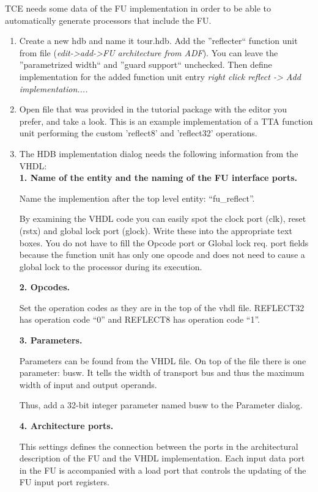 \documentclass[twoside]{tceusermanual}
\begin{document}
TCE needs some data of the FU implementation in order to be able to 
automatically generate processors that include the FU. \\
\begin{enumerate}
 \item%
Create a new hdb and name it tour.hdb. Add the ''reflecter`` function
unit from  file  (\textit{edit->add->FU architecture from ADF}).
You can leave the ''parametrized width`` and ''guard support`` unchecked.
Then define implementation for the added function unit entry \textit{right 
click reflect -> Add implementation....}\\

\item%
Open file  that was provided in the tutorial
package with the editor  you prefer, and take a look. This is an example
implementation of  a TTA function unit performing the custom 'reflect8'
and 'reflect32' operations.

\item%
The HDB implementation dialog needs the following information from the VHDL:\\

\textbf{1. Name of the entity and the naming of the FU interface ports.}

Name the implemention after the top level entity: ``fu\_reflect''.

By examining the VHDL code you can easily spot the clock port (clk),
reset (rstx) and global lock port (glock). Write these into the appropriate
text boxes. You do not have to fill the Opcode port or Global lock req. port
fields because the function unit has only one opcode and does not need to 
cause a global lock to the processor during its execution.

\textbf{2. Opcodes.}

Set the operation codes as they are in the top of the vhdl file. REFLECT32
has operation code ``0'' and REFLECT8 has operation code ``1''.

\textbf{3. Parameters.}

Parameters can be found from the VHDL file. On top of the file there is one
parameter: busw. It tells the width of transport bus and thus the maximum
width of input and output operands.

Thus, add a 32-bit integer parameter named busw to the Parameter dialog.

\textbf{4. Architecture ports.}

This settings defines the connection between the ports in the
architectural description of the FU and the VHDL implementation.
Each input data port in the FU is accompanied with a load port that
controls the updating of the FU input port registers.


\end{enumerate}
\end{document}
